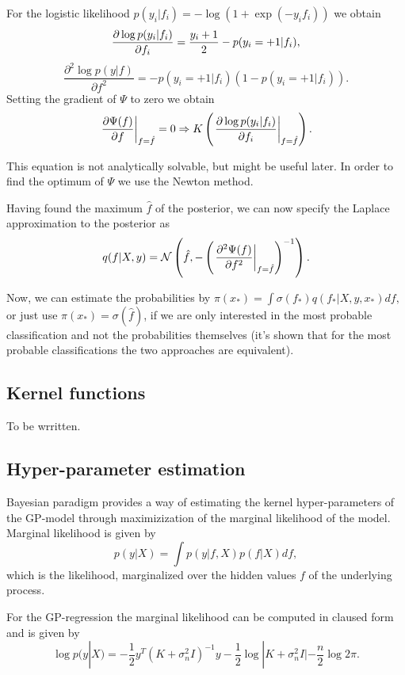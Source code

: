 \documentclass[12pt]{article}
\begin{document}
		For the logistic likelihood $p(y_i | f_i) = -\log (1 + \exp(-y_i f_i))$ we obtain
		$$\frac{\partial \log p(y_i | f_i)}{\partial f_i} = \frac {y_i + 1} 2 - p(y_i = +1 | f_i),$$
		$$\frac{\partial^2 \log p(y | f)}{\partial f^2} = - p(y_i = +1 | f_i)(1 - p(y_i = +1 | f_i)).$$
		Setting the gradient of $\Psi$ to zero we obtain
		\begin{equation}
			\label{laplace_method_optt_derivative}
			\left.\frac{\partial \Psi(f)}{\partial f}\right|_{f = \hat f} = 0 \Rightarrow K\left(\left.\frac{\partial \log p(y_i | f_i)}{\partial f_i}\right|_{f = \hat f}\right).
		\end{equation}

		This equation is not analytically solvable, but might be useful later. In order to find the optimum of $\Psi$ we use the Newton method.

		Having found the maximum $\hat f$ of the posterior, we can now specify the Laplace approximation to the posterior as 
		$$q(f | X, y) = \mathcal{N} \left(\hat f, - \left(\left. \frac{\partial^2 \Psi(f)}{\partial f^2} \right|_{f = \hat f}\right)^{-1}\right).$$

		Now, we can estimate the probabilities by
		$\pi(x_*) = \int \sigma(f_*) q(f_* | X, y, x_*) df,$
		or just use $\pi(x_*) = \sigma(\hat f)$, if we are only interested in the most probable classification and not the probabilities themselves (it's shown that for the most probable classifications the two approaches are equivalent).
	
\subsection{Kernel functions}
	To be wrritten.
	
\subsection{Hyper-parameter estimation}
	Bayesian paradigm provides a way of estimating the kernel hyper-parameters of the GP-model through maximizization of the marginal likelihood of the model. Marginal likelihood is given by
	$$p(y | X) = \int p(y | f, X) p(f | X) df,$$
	which is the likelihood, marginalized over the hidden values $f$ of the underlying process.

	For the GP-regression the marginal likelihood can be computed in claused form and is given by
	\begin{equation}
		\label{regression_ml}
		\log p(y | X) = -\frac 1 2 y^{T} (K + \sigma_n^2 I)^{-1} y - \frac 1 2 \log |K + \sigma_n^2 I| - \frac n 2 \log 2 \pi.
	\end{equation}
\end{document}
